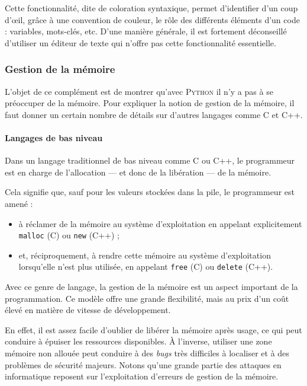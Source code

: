Cette fonctionnalité, dite de coloration syntaxique, permet d'identifier d'un coup d'œil, grâce à une convention de couleur, le rôle des différents éléments d'un code : variables, mots-clés, etc. D'une manière générale, il est fortement déconseillé d'utiliser un éditeur de texte qui n'offre pas cette fonctionnalité essentielle.


\subsubsection[Gestion de la mémoire]{Gestion de la mémoire}
\label{subsub:X.2.2.2}

L'objet de ce complément est de montrer qu'avec \textsc{Python} il n'y a pas à se préoccuper de la mémoire. Pour expliquer la notion de gestion de la mémoire, il faut donner un certain nombre de détails sur d'autres langages comme C et C++.

\paragraph{Langages de bas niveau}

Dans un langage traditionnel de bas niveau comme C ou C++, le programmeur est en charge de l'allocation --- et donc de la libération --- de la mémoire.

Cela signifie que, sauf pour les valeurs stockées dans la pile, le programmeur est amené :
\begin{itemize}
	\item à réclamer de la mémoire au système d'exploitation en appelant explicitement \texttt{malloc} (C) ou \texttt{new} (C++) ;
	\item et, réciproquement, à rendre cette mémoire au système d'exploitation lorsqu'elle n'est plus utilisée, en appelant \texttt{free} (C) ou \texttt{delete} (C++).
\end{itemize}

Avec ce genre de langage, la gestion de la mémoire est un aspect important de la programmation. Ce modèle offre une grande flexibilité, mais au prix d'un coût élevé en matière de vitesse de développement.

En effet, il est assez facile d'oublier de libérer la mémoire après usage, ce qui peut conduire à épuiser les ressources disponibles. À l'inverse, utiliser une zone mémoire non allouée peut conduire à des \textit{bugs} très difficiles à localiser et à des problèmes de sécurité majeurs. Notons qu'une grande partie des attaques en informatique reposent sur l'exploitation d'erreurs de gestion de la mémoire.


